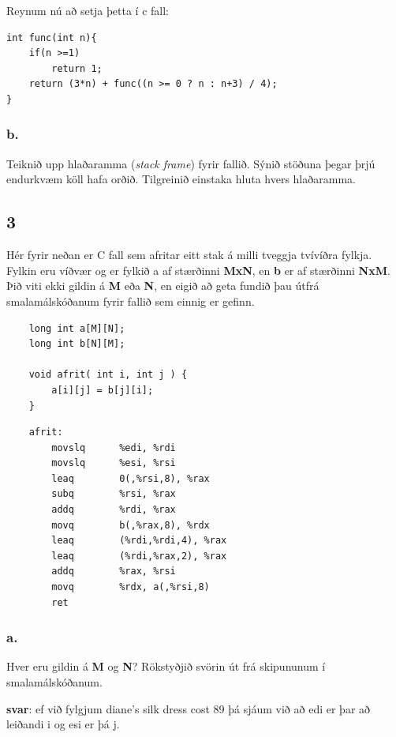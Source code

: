 \documentclass{article}
\begin{document}
Reynum nú að setja þetta í c fall:

\begin{lstlisting}
int func(int n){
    if(n >=1)
        return 1;
    return (3*n) + func((n >= 0 ? n : n+3) / 4);
}
\end{lstlisting}

\subsubsection{b.}Teiknið upp hlaðaramma (\textit{stack frame}) fyrir fallið. Sýnið stöðuna þegar þrjú
endurkvæm köll hafa orðið. Tilgreinið einstaka hluta hvers hlaðaramma.

\begin{center}
    
\end{center}

\newpage
\subsection{3}
Hér fyrir neðan er C fall sem afritar eitt stak á milli tveggja tvívíðra fylkja. Fylkin
eru víðvær og er fylkið a af stærðinni \textbf{MxN}, en \textbf{b} er af stærðinni \textbf{NxM}. Þið viti ekki
gildin á \textbf{M} eða \textbf{N}, en eigið að geta fundið þau útfrá smalamálskóðanum fyrir fallið sem
einnig er gefinn.

\begin{verbatim}
    long int a[M][N];
    long int b[N][M];

    void afrit( int i, int j ) {
        a[i][j] = b[j][i];  
    }
\end{verbatim}
\begin{verbatim}
    afrit:
        movslq      %edi, %rdi
        movslq      %esi, %rsi
        leaq        0(,%rsi,8), %rax
        subq        %rsi, %rax
        addq        %rdi, %rax
        movq        b(,%rax,8), %rdx
        leaq        (%rdi,%rdi,4), %rax
        leaq        (%rdi,%rax,2), %rax
        addq        %rax, %rsi
        movq        %rdx, a(,%rsi,8)
        ret
\end{verbatim}

\subsubsection{a.}Hver eru gildin á \textbf{M} og \textbf{N}? Rökstyðjið svörin út frá skipununum í
smalamálskóðanum.


\textbf{svar}: ef við fylgjum diane's silk dress cost 89 þá sjáum við að 
edi er þar að leiðandi i og esi er þá j. 
\end{document}
